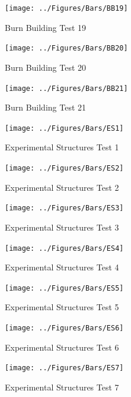 \documentclass[12pt,oneside]{book}
\begin{document}
\begin{figure}[!ht]
	\texttt{[image: ../Figures/Bars/BB19]}
	\caption{Burn Building Test 19}
	\label{fig:Burn_Building_Test_19}
\end{figure}

\begin{figure}[!ht]
	\texttt{[image: ../Figures/Bars/BB20]}
	\caption{Burn Building Test 20}
	\label{fig:Burn_Building_Test_20}
\end{figure}

\begin{figure}[!ht]
	\texttt{[image: ../Figures/Bars/BB21]}
	\caption{Burn Building Test 21}
	\label{fig:Burn_Building_Test_21}
\end{figure}

\clearpage

\begin{figure}[!ht]
	\texttt{[image: ../Figures/Bars/ES1]}
	\caption{Experimental Structures Test 1}
	\label{fig:Experimental_Structures_Test_1}
\end{figure}

\begin{figure}[!ht]
	\texttt{[image: ../Figures/Bars/ES2]}
	\caption{Experimental Structures Test 2}
	\label{fig:Experimental_Structures_Test_2}
\end{figure}

\begin{figure}[!ht]
	\texttt{[image: ../Figures/Bars/ES3]}
	\caption{Experimental Structures Test 3}
	\label{fig:Experimental_Structures_Test_3}
\end{figure}

\begin{figure}[!ht]
	\texttt{[image: ../Figures/Bars/ES4]}
	\caption{Experimental Structures Test 4}
	\label{fig:Experimental_Structures_Test_4}
\end{figure}

\clearpage

\begin{figure}[!ht]
	\texttt{[image: ../Figures/Bars/ES5]}
	\caption{Experimental Structures Test 5}
	\label{fig:Experimental_Structures_Test_5}
\end{figure}

\begin{figure}[!ht]
	\texttt{[image: ../Figures/Bars/ES6]}
	\caption{Experimental Structures Test 6}
	\label{fig:Experimental_Structures_Test_6}
\end{figure}

\begin{figure}[!ht]
	\texttt{[image: ../Figures/Bars/ES7]}
	\caption{Experimental Structures Test 7}
	\label{fig:Experimental_Structures_Test_7}
\end{figure}
\end{document}
